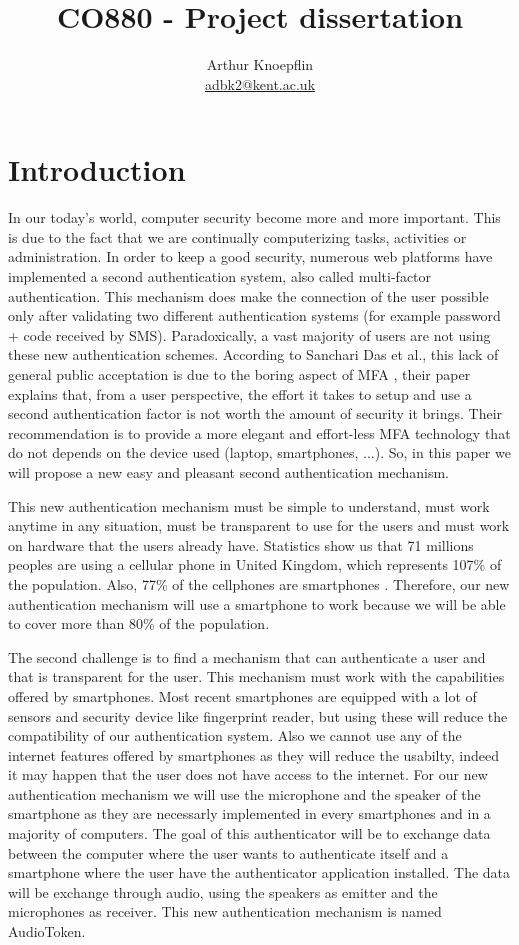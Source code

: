 \documentclass[twocolumn,14pt]{extarticle}
\title{CO880 - Project dissertation}
\author{Arthur Knoepflin\\\href{mailto:adbk2@kent.ac.uk}{adbk2@kent.ac.uk}}
\begin{document}
\onecolumn
\maketitle
\clearpage
\tableofcontents
\clearpage
\listoffigures
\twocolumn

\section{Introduction}
In our today's world, computer security become more and more important. This is due to the fact that we are continually computerizing tasks, activities or administration. In order to keep a good security, numerous web platforms have implemented a second authentication system, also called multi-factor authentication. This mechanism does make the connection of the user possible only after validating two different authentication systems (for example password + code received by SMS). Paradoxically, a vast majority of users are not using these new authentication schemes. According to Sanchari Das et al., this lack of general public acceptation is due to the boring aspect of MFA \cite{das2019mfa}, their paper explains that, from a user perspective, the effort it takes to setup and use a second authentication factor is not worth the amount of security it brings. Their recommendation is to provide a more elegant and effort-less MFA technology that do not depends on the device used (laptop, smartphones, ...). So, in this paper we will propose a new easy and pleasant second authentication mechanism.

This new authentication mechanism must be simple to understand, must work anytime in any situation, must be transparent to use for the users and must work on hardware that the users already have. Statistics show us that 71 millions peoples are using a cellular phone in United Kingdom, which represents 107\% of the population. Also, 77\% of the cellphones are smartphones \cite{comarketing_2019}. Therefore, our new authentication mechanism will use a smartphone to work because we will be able to cover more than 80\% of the population.

The second challenge is to find a mechanism that can authenticate a user and that is transparent for the user. This mechanism must work with the capabilities offered by smartphones. Most recent smartphones are equipped with a lot of sensors and security device like fingerprint reader, but using these will reduce the compatibility of our authentication system. Also we cannot use any of the internet features offered by smartphones as they will reduce the usabilty, indeed it may happen that the user does not have access to the internet. For our new authentication mechanism we will use the microphone and the speaker of the smartphone as they are necessarly implemented in every smartphones and in a majority of computers. The goal of this authenticator will be to exchange data between the computer where the user wants to authenticate itself and a smartphone where the user have the authenticator application installed. The data will be exchange through audio, using the speakers as emitter and the microphones as receiver. This new authentication mechanism is named AudioToken.
\end{document}
